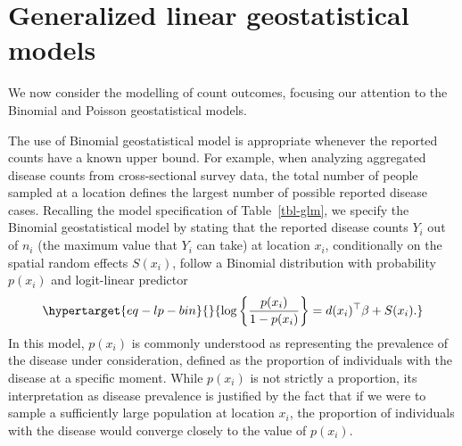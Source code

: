 \documentclass[
  letterpaper,
]{krantz}
\begin{document}
\hypertarget{generalized-linear-geostatistical-models}{%
\section{Generalized linear geostatistical
models}\label{generalized-linear-geostatistical-models}}

We now consider the modelling of count outcomes, focusing our attention
to the Binomial and Poisson geostatistical models.

The use of Binomial geostatistical model is appropriate whenever the
reported counts have a known upper bound. For example, when analyzing
aggregated disease counts from cross-sectional survey data, the total
number of people sampled at a location defines the largest number of
possible reported disease cases. Recalling the model specification of
Table~\ref{tbl-glm}, we specify the Binomial geostatistical model by
stating that the reported disease counts \(Y_i\) out of \(n_i\) (the
maximum value that \(Y_i\) can take) at location \(x_i\), conditionally
on the spatial random effects \(S(x_i)\), follow a Binomial distribution
with probability \(p(x_i)\) and logit-linear predictor
\begin{equation}\protect\hypertarget{eq-lp-bin}{}{
\log\left\{\frac{p(x_i)}{1-p(x_i)}\right\} = d(x_i)^\top \beta + S(x_i).
}\label{eq-lp-bin}\end{equation} In this model, \(p(x_i)\) is commonly
understood as representing the prevalence of the disease under
consideration, defined as the proportion of individuals with the disease
at a specific moment. While \(p(x_i)\) is not strictly a proportion, its
interpretation as disease prevalence is justified by the fact that if we
were to sample a sufficiently large population at location \(x_i\), the
proportion of individuals with the disease would converge closely to the
value of \(p(x_i)\).
\end{document}
